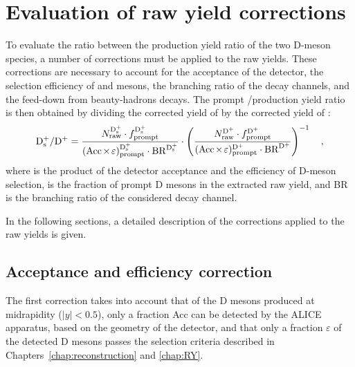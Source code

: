\chapter{Evaluation of raw yield corrections}

To evaluate the ratio between the production yield ratio of the two D-meson species, a number of corrections must be applied to the raw yields. These corrections are necessary to account for the acceptance of the detector, the selection efficiency of \ds and \dpl mesons, the branching ratio of the decay channels, and the feed-down from beauty-hadrons decays. The prompt \ds/\dpl production yield ratio is then obtained by dividing the corrected yield of \ds by the corrected yield of \dpl:
\begin{equation}\label{eq:DsDplusRatio}
        \mathrm{D_s^+}/\mathrm{D^+} = \frac{N_\mathrm{raw}^{\mathrm{D_s^+}}\cdot f_\mathrm{prompt}^\mathrm{D_s^+}}{(\mathrm{Acc}\mkern-2mu\times\mkern-2mu\varepsilon)_\mathrm{prompt}^\mathrm{D_s^+} \cdot \mathrm{BR}^\mathrm{D_s^+}} \cdot \left(\frac{N_\mathrm{raw}^{\mathrm{D^+}}\cdot f_\mathrm{prompt}^\mathrm{D^+}}{(\mathrm{Acc}\mkern-2mu\times\mkern-2mu\varepsilon)_\mathrm{prompt}^\mathrm{D^+} \cdot \mathrm{BR}^\mathrm{D^+}}\right)^{-1}\quad ,
\end{equation}
where \aeff is the product of the detector acceptance and the efficiency of D-meson selection, \fp is the fraction of prompt D mesons in the extracted raw yield, and BR is the branching ratio of the considered decay channel. 

In the following sections, a detailed description of the corrections applied to the raw yields is given.

\section{Acceptance and efficiency correction}
The first correction takes into account that of the D mesons produced at midrapidity ($\lvert y\rvert < 0.5$), only a fraction Acc can be detected by the ALICE apparatus, based on the geometry of the detector, and that only a fraction $\varepsilon$ of the detected D mesons passes the selection criteria described in Chapters~\ref{chap:reconstruction} and \ref{chap:RY}.


